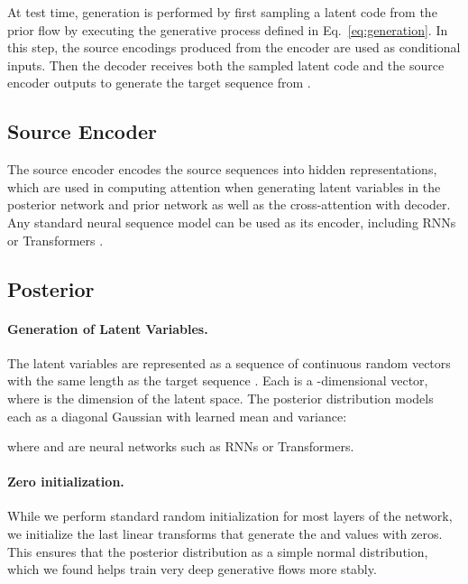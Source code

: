 \documentclass[11pt,a4paper]{article}
\begin{document}
At test time, generation is performed by first sampling a latent code  from the prior flow by executing the generative process defined in Eq.~\eqref{eq:generation}.
In this step, the source encodings produced from the encoder are used as conditional inputs.
Then the decoder receives both the sampled latent code  and the source encoder outputs to generate the target sequence  from .

\subsection{Source Encoder}
The source encoder encodes the source sequences into hidden representations, which are used in computing attention when generating latent variables in the posterior network and prior network as well as the cross-attention with decoder. 
Any standard neural sequence model can be used as its encoder, including RNNs \citep{bahdanau2014neural} or Transformers \cite{vaswani2017attention}.

\subsection{Posterior}
\paragraph{Generation of Latent Variables.} The latent variables  are represented as a sequence of continuous random vectors  with the same length as the target sequence . Each  is a -dimensional vector, where  is the dimension of the latent space. The posterior distribution  models each  as a diagonal Gaussian with learned mean and variance:

where  and  are neural networks such as RNNs or Transformers.

\paragraph{Zero initialization.} While we perform standard random initialization for most layers of the network, we initialize the last linear transforms that generate the  and  values with zeros.
This ensures that the posterior distribution as a simple normal distribution, which we found helps train very deep generative flows more stably.
\end{document}
